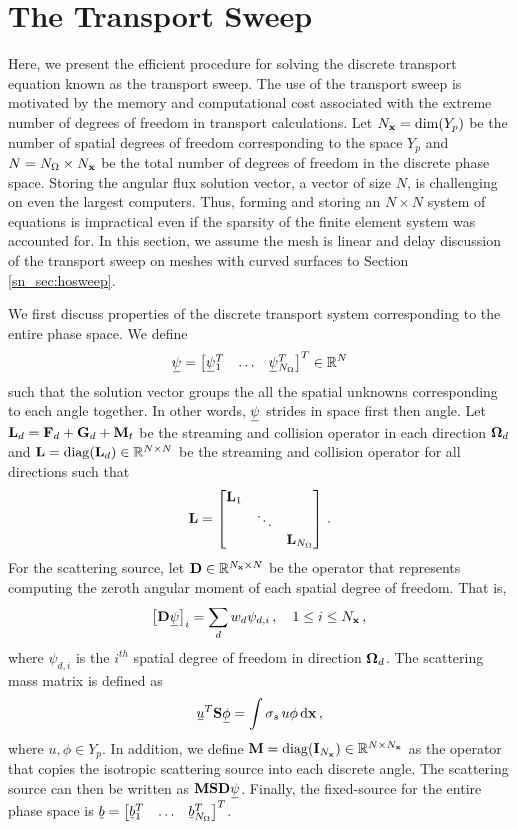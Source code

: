 \documentclass[../doc.tex]{subfiles}
\begin{document}
\section{The Transport Sweep} \label{sn_sec:sweep}
Here, we present the efficient procedure for solving the discrete transport equation known as the transport sweep. The use of the transport sweep is motivated by the memory and computational cost associated with the extreme number of degrees of freedom in transport calculations. Let $N_{\boldsymbol{\mathrm{x}}} = \dim(Y_p)$ be the number of spatial degrees of freedom corresponding to the space $Y_p$ and $N = N_\Omega \times N_{\boldsymbol{\mathrm{x}}}$ be the total number of degrees of freedom in the discrete phase space. Storing the angular flux solution vector, a vector of size $N$, is challenging on even the largest computers. Thus, forming and storing an $N\times N$ system of equations is impractical even if the sparsity of the finite element system was accounted for. In this section, we assume the mesh is linear and delay discussion of the transport sweep on meshes with curved surfaces to Section \ref{sn_sec:hosweep}. 

We first discuss properties of the discrete transport system corresponding to the entire phase space. We define 
	\begin{equation}
		\ubar{\psi} = \vector{\ubar{\psi}_1^T & \ldots & \ubar{\psi}_{N_\Omega}^T} \in \R^N 
	\end{equation}
such that the solution vector groups the all the spatial unknowns corresponding to each angle together. In other words, $\ubar{\psi}$ strides in space first then angle. 
Let $\boldsymbol{\mathrm{L}}_d = \boldsymbol{\mathrm{F}}_d + \boldsymbol{\mathrm{G}}_d + \boldsymbol{\mathrm{M}}_t$ be the streaming and collision operator in each direction $\boldsymbol{\Omega}_d$ and $\boldsymbol{\mathrm{L}} = \operatorname{diag}(\boldsymbol{\mathrm{L}}_d) \in \mathbb{R}^{N\times N}$ be the streaming and collision operator for all directions such that 
	\begin{equation}
		\boldsymbol{\mathrm{L}} = \begin{bmatrix} 
			\boldsymbol{\mathrm{L}}_1 \\ 
			& \ddots \\
			&& \boldsymbol{\mathrm{L}}_{N_\Omega}
		\end{bmatrix} \,. 
	\end{equation}
For the scattering source, let $\boldsymbol{\mathrm{D}} \in \mathbb{R}^{N_{\boldsymbol{\mathrm{x}}} \times N}$ be the operator that represents computing the zeroth angular moment of each spatial degree of freedom. That is, 
	\begin{equation}
		\bracket{\mat{D}\ubar{\psi}}_i = \sum_d w_d \psi_{d,i} \,, \quad 1 \leq i\leq N_{\x} \,,
	\end{equation}
where $\psi_{d,i}$ is the $i^{th}$ spatial degree of freedom in direction $\boldsymbol{\Omega}_d$. The scattering mass matrix is defined as 
	\begin{equation}
		\ubar{u}^T \mat{S} \ubar{\phi} = \int \sigma_s\, u\phi \ud \x \,, 
	\end{equation}
where $u,\phi \in Y_p$. In addition, we define $\boldsymbol{\mathrm{M}} = \operatorname{diag}(\boldsymbol{\mathrm{I}}_{N_{\boldsymbol{\mathrm{x}}}})\in \mathbb{R}^{N \times N_{\boldsymbol{\mathrm{x}}}}$ as the operator that copies the isotropic scattering source into each discrete angle. The scattering source can then be written as $\mat{M}\mat{S}\mat{D} \ubar{\psi}$. Finally, the fixed-source for the entire phase space is $\ubar{b} = \vector{\ubar{b}_1^T & \ldots & \ubar{b}_{N_\Omega}^T}$. 
\end{document}
